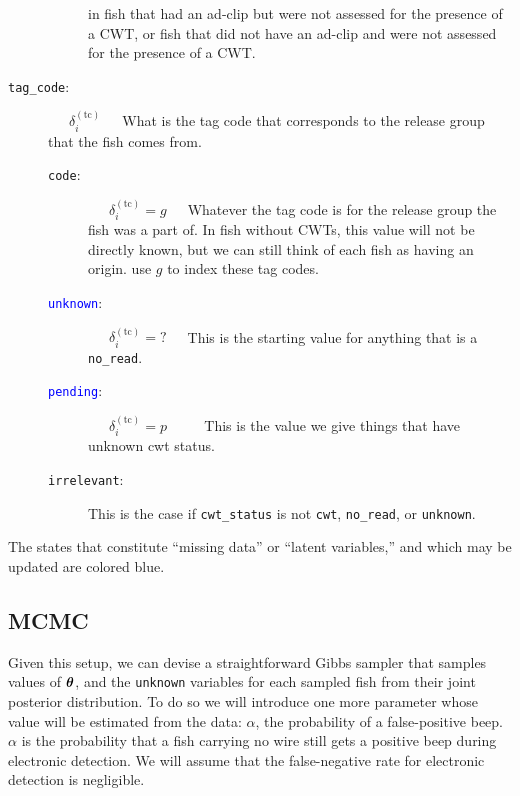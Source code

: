 \documentclass[11pt]{article}
\def\bm#1{\mathpalette\bmstyle{#1}}
\def\bmstyle#1#2{\mbox{\boldmath$#1#2$}}
\newcommand{\btheta}{\bm{\theta}}
\begin{document}
\begin{description}
\begin{description}
		in fish that had an ad-clip but were not assessed for the presence of a CWT, or fish that did not have
		an ad-clip and were not assessed for the presence of a CWT.
	\end{description}
	\item [{\tt tag\_code}:] ~~~$\delta_i^{(\mathrm{tc})}$~~~What is the tag code that corresponds to the release group that the fish comes from.
	\begin{description}
		\item [{\tt code}:] ~~~$\delta_i^{(\mathrm{tc})} = g$~~~Whatever the tag code is for the release group the fish was a part of.  In fish without CWTs, this value will not be directly known, but we can still think of each
		fish as having an origin.
		use $g$ to index these tag codes.
		\item [\textcolor{blue}{{\tt unknown}}:] ~~~$\delta_i^{(\mathrm{tc})} = \mbox{?}$~~~This is the starting value
		for anything that is a {\tt no\_read}.
		\item [\textcolor{blue}{{\tt pending}}:] ~~~$\delta_i^{(\mathrm{tc})} = p$ ~~~~ This is the value we give things
		that have unknown cwt status.  
		\item [{\tt irrelevant}:] This is the case if {\tt cwt\_status} is not {\tt cwt}, {\tt no\_read}, or {\tt unknown}.  
	\end{description}
\end{description}


The states that constitute ``missing data'' or ``latent variables,'' and which may be updated
are colored blue.

\subsection{MCMC}

Given this setup, we can devise a straightforward Gibbs sampler that samples values of $\btheta$, and the 
{\tt unknown} variables for each sampled fish from their joint posterior distribution. To do so we will
introduce one more parameter whose value will be estimated from the data:  $\alpha$, the probability
of a false-positive beep.  $\alpha$ is the probability that a fish carrying no wire still gets a positive
beep during electronic detection.  We will assume that the false-negative rate for electronic detection is
negligible.
\end{document}
